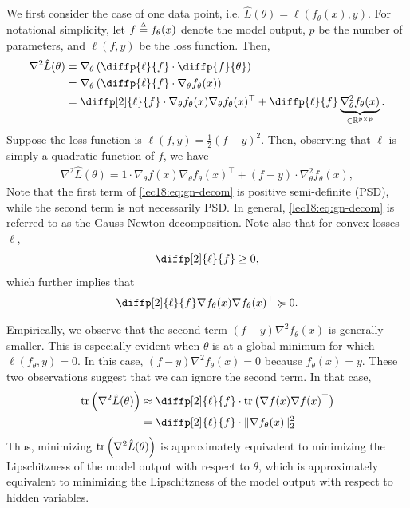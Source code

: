 We first consider the case of one data point, i.e. $\hat{L}(\theta) = \ell(f_\theta(x), y)$. For notational simplicity, let $f \defeq f_{\theta}(x)$ denote the model output, $p$ be the number of parameters, and $\ell(f,y)$ be the loss function. Then,
\begin{align}
    \nabla^2\hat{L}(\theta) &= \nabla_\theta \left(\diffp{\ell}{f}  \cdot \diffp{f}{\theta}\right) \\
    &= \nabla_\theta \left(\diffp{\ell}{f} \cdot \nabla_\theta f_\theta(x) \right) \\
    &= \diffp[2]{\ell}{f} \cdot \nabla_\theta f_{\theta}(x)\nabla_\theta f_{\theta}(x)^\top + \diffp{\ell}{f}\underbrace{\nabla_\theta^2 f_{\theta}(x)}_{\in \R^{p \times p}}.
\end{align}
Suppose the loss function is $\ell(f,y) = \frac{1}{2}(f-y)^2$. Then, observing that $\ell$ is simply a quadratic function of $f$, we have
\begin{align}\label{lec18:eq:gn-decom}
    \nabla^2\hat{L}(\theta) = 1 \cdot \nabla_\theta f(x) \nabla_\theta f_\theta(x)^\top + (f-y)\cdot\nabla^2_\theta f_\theta (x),   
\end{align}
Note that the first term of \eqref{lec18:eq:gn-decom} is positive semi-definite (PSD), while the second term is not necessarily PSD. In general, \eqref{lec18:eq:gn-decom} is referred to as the Gauss-Newton decomposition. Note also that for convex losses $\ell$, 
\begin{align}
    \diffp[2]{\ell}{f} \geq 0,
\end{align}
which further implies that
\begin{align}
    \diffp[2]{\ell}{f}\nabla f_\theta (x) \nabla f_\theta (x)^\top \succcurlyeq 0.   
\end{align}

Empirically, we observe that the second term $(f-y)\nabla^2f_{\theta}(x)$ is generally smaller. This is especially evident when $\theta$ is at a global minimum for which $\ell(f_\theta, y) = 0$. In this case, $(f-y)\nabla^2f_{\theta}(x)=0$ because $f_{\theta}(x)=y$. These two observations suggest that we can ignore the second term. In that case,
\begin{align}
    \mathrm{tr}\l (\nabla^2\hat{L}(\theta) \r ) &\approx \diffp[2]{\ell}{f} \cdot \mathrm{tr}\l (\nabla f(x)\nabla f(x)^\top\r ) \\
    &=\diffp[2]{\ell}{f} \cdot \norm{\nabla  f_{\theta}(x)}_2^2
\end{align}
Thus, minimizing $\mathrm{tr}\left (\nabla^2\hat{L}(\theta)\right )$ is approximately equivalent to minimizing the Lipschitzness of the model output with respect to $\theta$, which is approximately equivalent to minimizing the Lipschitzness of the model output with respect to hidden variables.

